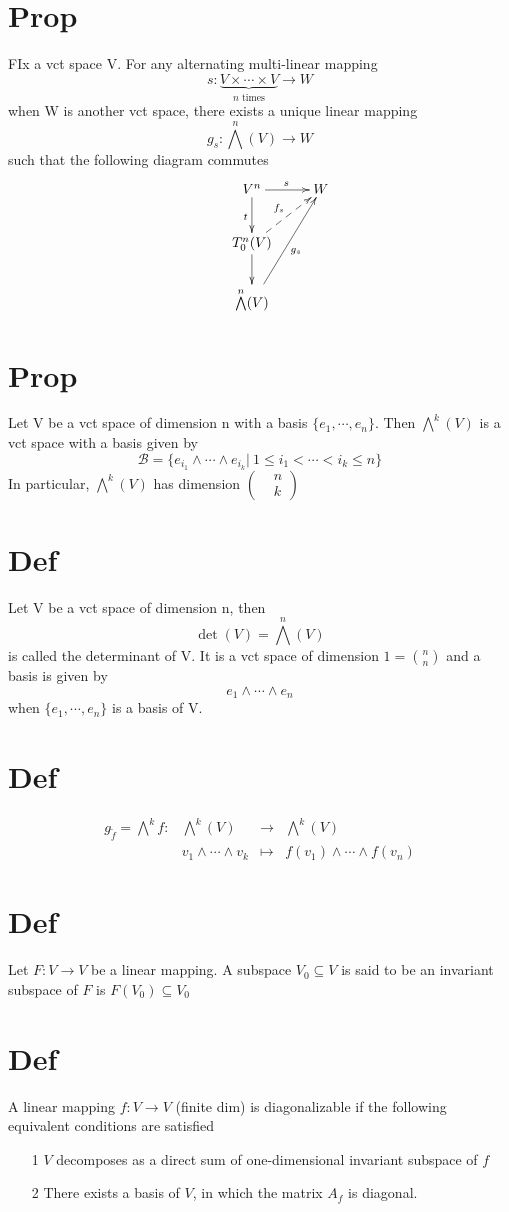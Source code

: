\documentclass{book}
\begin{document}
\section{Prop}
\label{VIII-46.8}
FIx a vct space V. For any alternating multi-linear mapping
$$s:\underbrace{V\times\cdots\times V}\limits_{n\text{ times}}\rightarrow W$$
when W is another vct space, there exists a unique linear mapping$$g_s:\bigwedge\limits^n(V)\rightarrow W$$
such that the following diagram commutes
$$\xymatrix{
    & V^n\ar[d]_t\ar[r]^s & W\\
    &T^n_0(V)\ar@{-->}[ur]^{f_s}\ar[d] &\\
    & \bigwedge\limits^n(V)\ar[uur]_{g_s}
}$$
\section{Prop}
Let V be a vct space of dimension n with a basis $\{e_1,\cdots,e_n\}$. Then $\bigwedge\limits^k(V)$ is a vct space with a basis given by $$\mathcal{B}=\{e_{i_1}\wedge\cdots\wedge e_{i_k}\big|\ 1\leq i_1<\cdots<i_k\leq n\}$$
In particular, $\bigwedge\limits^k(V)$ has dimension $\left(\begin{aligned}
    &n \\ &k
\end{aligned}
\right)$
\section{Def}
Let V be a vct space of dimension n, then 
$$\det(V)=\bigwedge\limits^n(V)$$
is called the determinant of V. It is a vct space of dimension $1=\binom{n}{n}$ and a basis is given by $$e_1\wedge\cdots\wedge e_n$$
when $\{e_1,\cdots,e_n\}$ is a basis of V.
\section{Def}
$$
\begin{aligned}
    g_{\widetilde{f}}=\bigwedge\limits^kf: &\bigwedge\limits^k(V) &\rightarrow &\bigwedge\limits^k(V)\\
    &v_1\wedge\cdots\wedge v_k &\mapsto & f(v_1)\wedge\cdots\wedge f(v_n)
\end{aligned}$$
\section{Def}
Let $F:V\rightarrow V$ be a linear mapping. A subspace $V_0\subseteq V$ is said to be an invariant subspace of $F$ is $F(V_0)\subseteq V_0$
\section{Def}
A linear mapping $f:V\rightarrow V$ (finite dim) is diagonalizable if the following equivalent conditions are satisfied
\begin{itemize}
    \item [1] $V$ decomposes as a direct sum of one-dimensional invariant subspace of $f$
    \item [2] There exists a basis of $V$, in which the matrix $A_f$ is diagonal.
\end{itemize}
\end{document}
